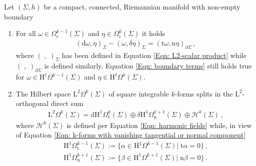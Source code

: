 \begin{theorem}\label{Thm: Hodge decomposition for manifolds with boundary}
	Let $(\Sigma,h)$ be a compact, connected, Riemannian manifold with non-empty boundary %
	\begin{enumerate}
		\item
		For all $\omega\in \Omega_\mathrm{c}^{k-1}(\Sigma)$ and $\eta\in \Omega_\mathrm{c}^{k}(\Sigma)$ it holds
		\begin{align}\label{Eqn: boundary terms}
			(\mathrm{d}\omega,\eta)_\Sigma-(\omega,\delta\eta)_\Sigma=
			(\mathrm{t}\omega,\mathrm{n}\eta)_{\partial\Sigma}\,,
		\end{align}
		where $(\;,\;)_\Sigma$ has been defined in Equation \eqref{Eqn: L2-scalar product} while $(\;,\;)_{\partial\Sigma}$ is defined similarly.
		Equation \eqref{Eqn: boundary terms} still holds true for $\omega\in \mathrm{H}^\ell\Omega^{k-1}(\Sigma)$ and $\eta\in \mathrm{H}^\ell\Omega^{k}(\Sigma)$.
		\item
		The Hilbert space $\mathrm{L}^2\Omega^k(\Sigma)$ of square integrable $k$-forms splits in the $\mathrm{L}^2$-orthogonal direct sum
		\begin{align}\label{Eqn: Hodge decomposition for manifold with boundary}
			\mathrm{L}^2\Omega^k(\Sigma)=
			\mathrm{d} \mathrm{H}^1\Omega^k_{\mathrm{t}}(\Sigma)\oplus
			\delta \mathrm{H}^1\Omega^{k+1}_{\mathrm{n}}(\Sigma)
			\oplus\mathcal{H}^k(\Sigma)\,,		
		\end{align}
		where $\mathcal{H}^k(\Sigma)$ is defined per Equation \eqref{Eqn: harmonic fields} while, in view of Equation \eqref{Eqn: k-forms with vanishing tangential or normal component}
		\begin{align}\label{Eqn: Dirichlet and Neumann forms}
			\mathrm{H}^1\Omega^{k-1}_{\mathrm{t}}(\Sigma):=\lbrace\alpha\in \mathrm{H}^1\Omega^{k-1}(\Sigma)|\;\mathrm{t}\alpha=0\rbrace\,,\\
			\mathrm{H}^1\Omega^{k+1}_{\mathrm{n}}(\Sigma):=\lbrace\beta\in \mathrm{H}^1\Omega^{k+1}(\Sigma)|\;\mathrm{n}\beta=0\rbrace\,.
		\end{align} 
	\end{enumerate}
\end{theorem}
